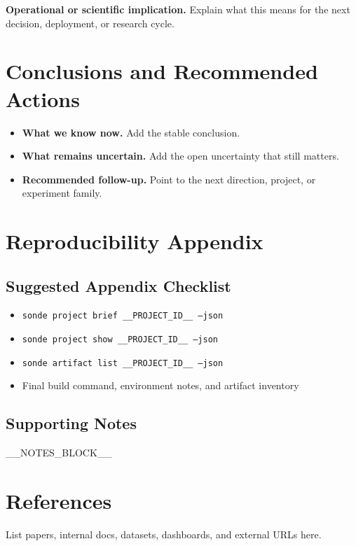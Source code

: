 \documentclass[8pt,twocolumn]{extarticle}
\newcommand{\placeholder}[1]{\textcolor{SondeMuted}{#1}}
\newcommand{\decision}[1]{\textbf{#1}}
\begin{document}
\vspace{0.35em}
\decision{Operational or scientific implication.} \placeholder{Explain what this means for the next decision, deployment, or research cycle.}

\section*{Conclusions and Recommended Actions}

\begin{itemize}
  \item \decision{What we know now.} \placeholder{Add the stable conclusion.}
  \item \decision{What remains uncertain.} \placeholder{Add the open uncertainty that still matters.}
  \item \decision{Recommended follow-up.} \placeholder{Point to the next direction, project, or experiment family.}
\end{itemize}

\appendix

\section*{Reproducibility Appendix}

\subsection*{Suggested Appendix Checklist}
\begin{itemize}
  \item \texttt{sonde project brief __PROJECT_ID__ --json}
  \item \texttt{sonde project show __PROJECT_ID__ --json}
  \item \texttt{sonde artifact list __PROJECT_ID__ --json}
  \item \placeholder{Final build command, environment notes, and artifact inventory}
\end{itemize}

\subsection*{Supporting Notes}
__NOTES_BLOCK__

\section*{References}
\placeholder{List papers, internal docs, datasets, dashboards, and external URLs here.}
\end{document}
